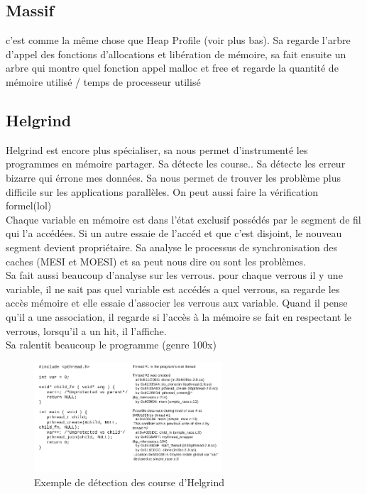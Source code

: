 \documentclass[oneside]{book}
\begin{document}
\subsection{Massif}
c'est comme la même chose que Heap Profile (voir plus bas). Sa regarde l'arbre d'appel des fonctions d'allocations et libération de mémoire, sa fait ensuite un arbre qui montre quel fonction appel malloc et free et regarde la quantité de mémoire utilisé / temps de processeur utilisé

\subsection{Helgrind}
Helgrind est encore plus spécialiser, sa nous permet d'instrumenté les programmes en mémoire partager. Sa détecte les course.. Sa détecte les erreur bizarre qui érrone mes données. Sa nous permet de trouver les problème plus difficile sur les applications parallèles. On peut aussi faire la vérification formel(lol)\\

Chaque variable en mémoire est dans l'état exclusif possédés par le segment de fil qui l'a accédées. Si un autre essaie de l'accéd et que c'est disjoint, le nouveau segment devient propriétaire. Sa analyse le processus de synchronisation des caches (MESI et MOESI) et sa peut nous dire ou sont les problèmes.\\

Sa fait aussi beaucoup d'analyse sur les verrous. pour chaque verrous il y une variable, il ne sait pas quel variable est accédés a quel verrous, sa regarde les accès mémoire et elle essaie d'associer les verrous aux variable. Quand il pense qu'il a une association, il regarde si l'accès à la mémoire se fait en respectant le verrous, lorsqu'il a un hit, il l'affiche.\\

Sa ralentit beaucoup le programme (genre 100x)\\

\begin{figure}[!ht]
\centering
\includegraphics[width = 7cm]{detection_course.png}
\caption{Exemple de détection des course d'Helgrind}
\label{fig:detection_course}
\end{figure}
\end{document}
